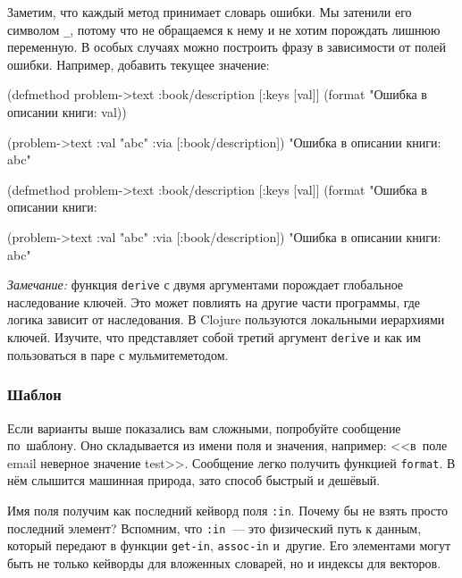 \fi


Заметим, что каждый метод принимает словарь ошибки. Мы затенили его символом
\verb|_|, потому что не обращаемся к нему и не хотим порождать лишнюю
переменную. В особых случаях можно построить фразу в зависимости от полей
ошибки. Например, добавить текущее значение:

\ifx\devicetype\mobile

  \begin{clojure}
(defmethod problem->text
  :book/description
  [{:keys [val]}]
  (format "Ошибка в описании книги: %
    val))

(problem->text
  {:val "abc" :via [:book/description]})
"Ошибка в описании книги: abc"
  \end{clojure}

\else

  \begin{clojure}
(defmethod problem->text :book/description
  [{:keys [val]}]
  (format "Ошибка в описании книги: %

(problem->text {:val "abc" :via [:book/description]})
"Ошибка в описании книги: abc"
  \end{clojure}

\fi

\emph{Замечание:} функция \verb|derive| с двумя аргументами порождает
глобальное наследование ключей. Это может повлиять на другие части программы,
где логика зависит от наследования. В Clojure пользуются локальными иерархиями
ключей. Изучите, что представляет собой третий аргумент \verb|derive| и как им
пользоваться в паре с мульмитеметодом.

\subsubsection{Шаблон}


Если варианты выше показались вам сложными, попробуйте сообщение по~шаблону. Оно
складывается из имени поля и значения, например: <<в~поле email неверное
значение test>>. Сообщение легко получить функцией \verb|format|. В нём
слышится машинная природа, зато способ быстрый и дешёвый.

Имя поля получим как последний кейворд поля \verb|:in|. Почему бы не взять
просто последний элемент? Вспомним, что \verb|:in|~--- это физический путь к данным,
который передают в функции \verb|get-in|, \verb|assoc-in| и~другие. Его
элементами могут быть не только кейворды для вложенных словарей, но и индексы
для векторов.

